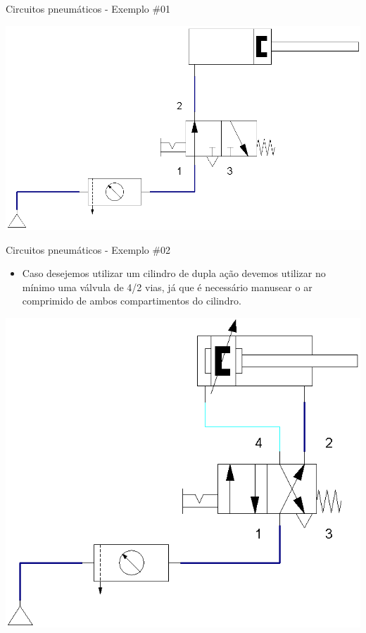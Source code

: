 \begin{frame}{Circuitos pneumáticos - Exemplo \#01}
	
	\centering
	\includegraphics[width=0.9\linewidth]{Figuras/Ch14/fig40n2}
	
\end{frame}


\begin{frame}{Circuitos pneumáticos - Exemplo \#02}
	\begin{block}{}
		\begin{itemize}
			\item Caso desejemos utilizar um cilindro de dupla ação devemos utilizar no mínimo uma válvula de 4/2 vias, já que é necessário manusear o ar comprimido de ambos compartimentos do cilindro.
		\end{itemize}
	\end{block}
	
	\medskip
	
	\centering
	\includegraphics[width=0.55\linewidth]{Figuras/Ch14/fig42}
	
\end{frame}



